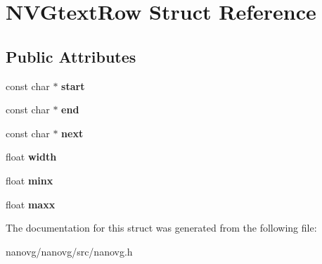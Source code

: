 \hypertarget{struct_n_v_gtext_row}{\section{N\+V\+Gtext\+Row Struct Reference}
\label{struct_n_v_gtext_row}
}
\subsection*{Public Attributes}
\begin{DoxyCompactItemize}
\item 
\hypertarget{struct_n_v_gtext_row_ae0d868be9f65a22eba6fc01f969aea0b}{const char $\ast$ {\bfseries start}}\label{struct_n_v_gtext_row_ae0d868be9f65a22eba6fc01f969aea0b}

\item 
\hypertarget{struct_n_v_gtext_row_a4782f1bdd45f50679efaec4f1e3e73fa}{const char $\ast$ {\bfseries end}}\label{struct_n_v_gtext_row_a4782f1bdd45f50679efaec4f1e3e73fa}

\item 
\hypertarget{struct_n_v_gtext_row_a593a3eec246cf91ddad5617132b3d916}{const char $\ast$ {\bfseries next}}\label{struct_n_v_gtext_row_a593a3eec246cf91ddad5617132b3d916}

\item 
\hypertarget{struct_n_v_gtext_row_a94481448fed11625d1aeb56531ecf3a0}{float {\bfseries width}}\label{struct_n_v_gtext_row_a94481448fed11625d1aeb56531ecf3a0}

\item 
\hypertarget{struct_n_v_gtext_row_ace83ebb3ae1a6c14d7104284d4813d7c}{float {\bfseries minx}}\label{struct_n_v_gtext_row_ace83ebb3ae1a6c14d7104284d4813d7c}

\item 
\hypertarget{struct_n_v_gtext_row_a022c194fd146e8cf80be30a183f64871}{float {\bfseries maxx}}\label{struct_n_v_gtext_row_a022c194fd146e8cf80be30a183f64871}

\end{DoxyCompactItemize}


The documentation for this struct was generated from the following file\+:\begin{DoxyCompactItemize}
\item 
nanovg/nanovg/src/nanovg.\+h\end{DoxyCompactItemize}
